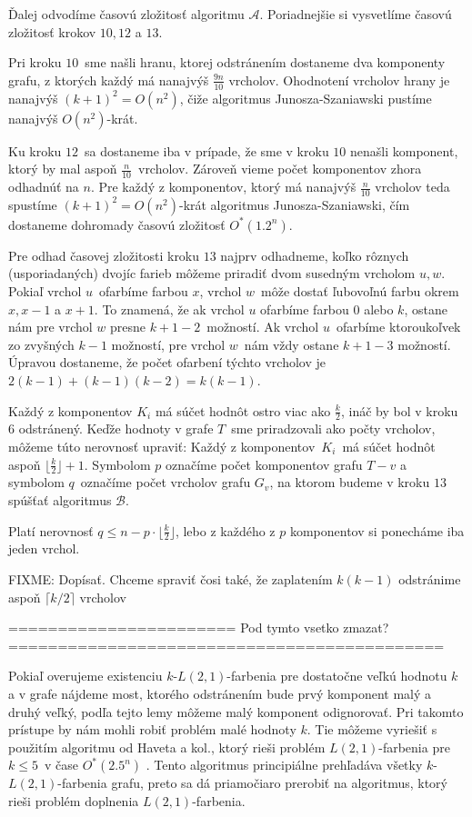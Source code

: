 Ďalej odvodíme časovú zložitosť algoritmu $\mathcal{A}$. Poriadnejšie si vysvetlíme časovú zložitosť
krokov $10, 12$ a $13$.

Pri kroku $10$ sme našli hranu, ktorej odstránením dostaneme dva komponenty
grafu, z ktorých každý má nanajvýš $\frac{9n}{10}$ vrcholov. Ohodnotení vrcholov hrany je nanajvýš
$(k+1)^2 = O(n^2)$, čiže algoritmus Junosza-Szaniawski pustíme nanajvýš $O(n^2)$-krát.

Ku kroku $12$ sa dostaneme iba v prípade, že sme v kroku $10$ nenašli komponent, ktorý by mal
aspoň $\frac{n}{10}$ vrcholov. Zároveň vieme počet komponentov zhora odhadnúť na $n$. Pre každý
z komponentov, ktorý má nanajvýš $\frac{n}{10}$ vrcholov teda spustíme $(k+1)^2 = O(n^2)$-krát
algoritmus Junosza-Szaniawski, čím dostaneme dohromady časovú zložitosť $O^*(1.2^n)$.

Pre odhad časovej zložitosti kroku $13$ najprv odhadneme, koľko rôznych (usporiadaných) dvojíc
farieb môžeme priradiť dvom susedným vrcholom $u, w$. 
Pokiaľ vrchol $u$ ofarbíme farbou $x$, vrchol $w$ môže dostať ľubovoľnú farbu okrem $x, x-1$ a $x + 1$.
To znamená, že ak vrchol $u$ ofarbíme farbou $0$ alebo $k$, ostane nám pre vrchol $w$ presne $k + 1 - 2$ možností.
Ak vrchol $u$ ofarbíme ktoroukoľvek zo zvyšných $k-1$ možností, pre vrchol $w$ nám vždy ostane $k + 1 - 3$
možností. Úpravou dostaneme, že počet ofarbení týchto vrcholov je $2(k-1) + (k-1)(k-2) = k(k-1)$.

Každý z komponentov $K_i$ má súčet hodnôt ostro viac ako $\frac{k}{2}$, ináč by bol v kroku $6$
odstránený. Keďže hodnoty v grafe $T$ sme priradzovali ako počty vrcholov, môžeme túto nerovnosť upraviť:
Každý z komponentov $K_i$ má súčet hodnôt aspoň $\lfloor \frac{k}{2} \rfloor + 1$. Symbolom $p$
označíme počet komponentov grafu $T - v$ a symbolom $q$ označíme počet vrcholov grafu $G_v$,
na ktorom budeme v kroku $13$ spúšťať algoritmus $\mathcal{B}$.

Platí nerovnosť $q \leq n - p \cdot \lfloor \frac{k}{2} \rfloor$, lebo z každého z $p$ komponentov
si ponecháme iba jeden vrchol.

FIXME: Dopísať. Chceme spraviť čosi také, že zaplatením $k(k-1)$ odstránime aspoň $\lceil k/2 \rceil$ vrcholov

======================= Pod tymto vsetko zmazat? ============================================

Pokiaľ overujeme existenciu $k$-$L(2,1)$-farbenia pre dostatočne veľkú hodnotu $k$ a v grafe
nájdeme most, ktorého odstránením bude prvý komponent malý a druhý veľký, podľa tejto lemy
môžeme malý komponent odignorovať. Pri takomto prístupe by nám mohli robiť problém malé
hodnoty $k$. Tie môžeme vyriešiť s použitím algoritmu od Haveta a kol., ktorý rieši
problém $L(2,1)$-farbenia pre $k \leq 5$ v čase $O^*(2.5^n)$ \cite{havet}. Tento
algoritmus principiálne prehľadáva všetky $k$-$L(2,1)$-farbenia grafu, preto sa dá
priamočiaro prerobiť na algoritmus, ktorý rieši problém doplnenia $L(2,1)$-farbenia.

